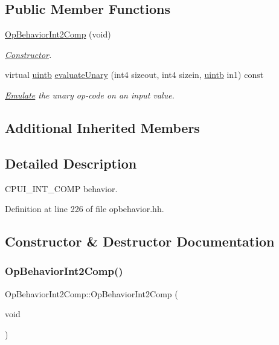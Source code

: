 \subsection*{Public Member Functions}
\begin{DoxyCompactItemize}
\item 
\mbox{\hyperlink{class_op_behavior_int2_comp_a3a7b93a3d4fd1a7cf1cc4c0910a66f26}{Op\+Behavior\+Int2\+Comp}} (void)
\begin{DoxyCompactList}\small\item\em \mbox{\hyperlink{class_constructor}{Constructor}}. \end{DoxyCompactList}\item 
virtual \mbox{\hyperlink{types_8h_a2db313c5d32a12b01d26ac9b3bca178f}{uintb}} \mbox{\hyperlink{class_op_behavior_int2_comp_aae6f3ee2de9b13a268e8c56b00788655}{evaluate\+Unary}} (int4 sizeout, int4 sizein, \mbox{\hyperlink{types_8h_a2db313c5d32a12b01d26ac9b3bca178f}{uintb}} in1) const
\begin{DoxyCompactList}\small\item\em \mbox{\hyperlink{class_emulate}{Emulate}} the unary op-\/code on an input value. \end{DoxyCompactList}\end{DoxyCompactItemize}
\subsection*{Additional Inherited Members}


\subsection{Detailed Description}
C\+P\+U\+I\+\_\+\+I\+N\+T\+\_\+C\+O\+MP behavior. 

Definition at line 226 of file opbehavior.\+hh.



\subsection{Constructor \& Destructor Documentation}
\mbox{\label{class_op_behavior_int2_comp_a3a7b93a3d4fd1a7cf1cc4c0910a66f26}} 
\subsubsection{\texorpdfstring{OpBehaviorInt2Comp()}{OpBehaviorInt2Comp()}}
{\footnotesize\ttfamily Op\+Behavior\+Int2\+Comp\+::\+Op\+Behavior\+Int2\+Comp (\begin{DoxyParamCaption}\item[{void}]{ }\end{DoxyParamCaption})\hspace{0.3cm}{\ttfamily [inline]}}



